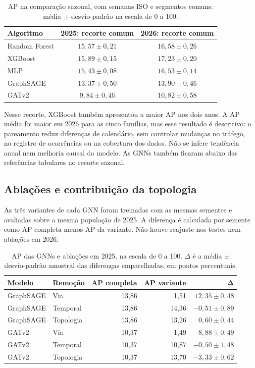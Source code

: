 \documentclass[12pt]{article}
\begin{document}
\begin{table}[!ht]
\centering
\caption{AP na comparação sazonal, com semanas ISO e segmentos
comuns: média $\pm$ desvio-padrão na escala de 0 a 100.}
\label{tab:modelos-sazonal}
\small
\begin{tabular}{lcc}
\toprule
\textbf{Algoritmo} & \textbf{2025: recorte comum} &
\textbf{2026: recorte comum} \\
\midrule
Random Forest & $15{,}57 \pm 0{,}21$ & $16{,}58 \pm 0{,}26$ \\
XGBoost & $15{,}89 \pm 0{,}15$ & $17{,}23 \pm 0{,}20$ \\
MLP & $15{,}43 \pm 0{,}08$ & $16{,}53 \pm 0{,}14$ \\
GraphSAGE & $13{,}37 \pm 0{,}50$ & $13{,}90 \pm 0{,}46$ \\
GATv2 & $9{,}84 \pm 0{,}46$ & $10{,}82 \pm 0{,}58$ \\
\bottomrule
\end{tabular}
\end{table}

Nesse recorte, XGBoost também apresentou a maior AP nos dois anos.
A AP média foi maior em 2026 para as cinco famílias, mas esse
resultado é descritivo: o pareamento reduz diferenças de calendário,
sem controlar mudanças no tráfego, no registro de ocorrências ou na
cobertura dos dados. Não se infere tendência anual nem melhoria
causal do modelo. As GNNs também ficaram abaixo das referências
tabulares no recorte sazonal.

\subsection{Ablações e contribuição da topologia}

As três variantes de cada GNN foram treinadas com as mesmas sementes
e avaliadas sobre a mesma população de 2025. A diferença é calculada
por semente como AP completa menos AP da variante. Não houve
reajuste nos testes nem ablações em 2026.

\begin{table}[!ht]
\centering
\caption{AP das GNNs e ablações em 2025, na escala de 0 a 100.
$\Delta$ é a média $\pm$ desvio-padrão amostral das diferenças
emparelhadas, em pontos percentuais.}
\label{tab:ablacoes}
\small
\begin{tabular}{llrrr}
\toprule
\textbf{Modelo} & \textbf{Remoção} & \textbf{AP completa} &
\textbf{AP variante} & $\boldsymbol{\Delta}$ \\
\midrule
GraphSAGE & Via & 13,86 & 1,51 & $12{,}35 \pm 0{,}48$ \\
GraphSAGE & Temporal & 13,86 & 14,36 & $-0{,}51 \pm 0{,}89$ \\
GraphSAGE & Topologia & 13,86 & 13,26 & $0{,}60 \pm 0{,}44$ \\
GATv2 & Via & 10,37 & 1,49 & $8{,}88 \pm 0{,}49$ \\
GATv2 & Temporal & 10,37 & 10,87 & $-0{,}50 \pm 1{,}48$ \\
GATv2 & Topologia & 10,37 & 13,70 & $-3{,}33 \pm 0{,}62$ \\
\bottomrule
\end{tabular}
\end{table}
\end{document}
